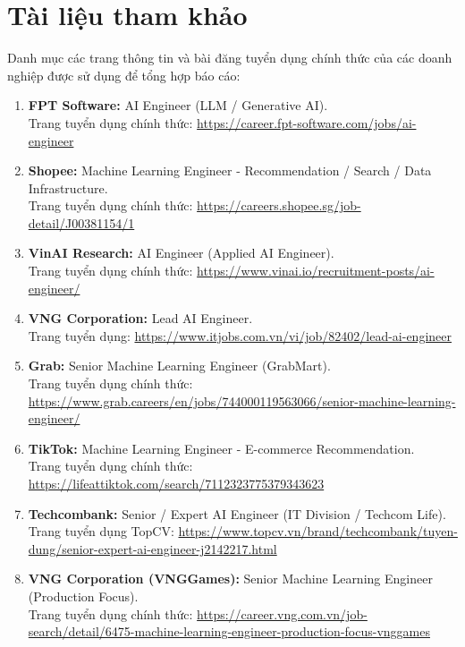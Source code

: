 \section{Tài liệu tham khảo}

Danh mục các trang thông tin và bài đăng tuyển dụng chính thức của các doanh nghiệp được sử dụng để tổng hợp báo cáo:

\begin{enumerate}
    \item \textbf{FPT Software:} AI Engineer (LLM / Generative AI). \\
    Trang tuyển dụng chính thức: \url{https://career.fpt-software.com/jobs/ai-engineer}
    
    \item \textbf{Shopee:} Machine Learning Engineer - Recommendation / Search / Data Infrastructure. \\
    Trang tuyển dụng chính thức: \url{https://careers.shopee.sg/job-detail/J00381154/1}
    
    \item \textbf{VinAI Research:} AI Engineer (Applied AI Engineer). \\
    Trang tuyển dụng chính thức: \url{https://www.vinai.io/recruitment-posts/ai-engineer/}
    
    \item \textbf{VNG Corporation:} Lead AI Engineer. \\
    Trang tuyển dụng: \url{https://www.itjobs.com.vn/vi/job/82402/lead-ai-engineer}
    
    \item \textbf{Grab:} Senior Machine Learning Engineer (GrabMart). \\
    Trang tuyển dụng chính thức: \url{https://www.grab.careers/en/jobs/744000119563066/senior-machine-learning-engineer/}
    
    \item \textbf{TikTok:} Machine Learning Engineer - E-commerce Recommendation. \\
    Trang tuyển dụng chính thức: \url{https://lifeattiktok.com/search/7112323775379343623}
    
    \item \textbf{Techcombank:} Senior / Expert AI Engineer (IT Division / Techcom Life). \\
    Trang tuyển dụng TopCV: \url{https://www.topcv.vn/brand/techcombank/tuyen-dung/senior-expert-ai-engineer-j2142217.html}
    
    \item \textbf{VNG Corporation (VNGGames):} Senior Machine Learning Engineer (Production Focus). \\
    Trang tuyển dụng chính thức: \url{https://career.vng.com.vn/job-search/detail/6475-machine-learning-engineer-production-focus-vnggames}
    

\end{enumerate}
